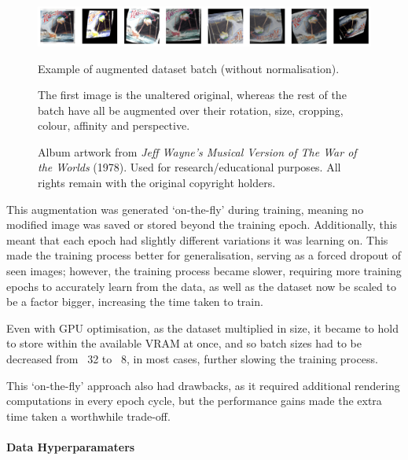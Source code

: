                         \begin{figure}[h]
                            \centering
                            \includegraphics[width=\textwidth]{images/AugmentedArts.png}
                            \caption{Example of augmented dataset batch (without normalisation).}
                            \label{fig:augmentedArts}
                            \caption*{
                                The first image is the unaltered original, whereas the rest of the batch have all be augmented over their rotation, size, cropping, colour, affinity and perspective.
                            }
                            \caption*{
                                Album artwork from \textit{Jeff Wayne's Musical Version of The War of the Worlds} (1978).  
                                \footnotesize Used for research/educational purposes. All rights remain with the original copyright holders.
                            }
                        \end{figure}
    
                        This augmentation was generated `on-the-fly' during training, meaning no modified image was saved or stored beyond the training epoch. Additionally, this meant that each epoch had slightly different variations it was learning on. This made the training process better for generalisation, serving as a forced dropout of seen images; however, the training process became slower, requiring more training epochs to accurately learn from the data, as well as the dataset now be scaled to be a factor bigger, increasing the time taken to train.
    
                        Even with GPU optimisation, as the dataset multiplied in size, it became to hold to store within the available VRAM at once, and so batch sizes had to be decreased from ~32 to ~8, in most cases, further slowing the training process.
    
                        This `on-the-fly' approach also had drawbacks, as it required additional rendering computations in every epoch cycle, but the performance gains made the extra time taken a worthwhile trade-off.
        
                    \paragraph{Data Hyperparamaters}
    
